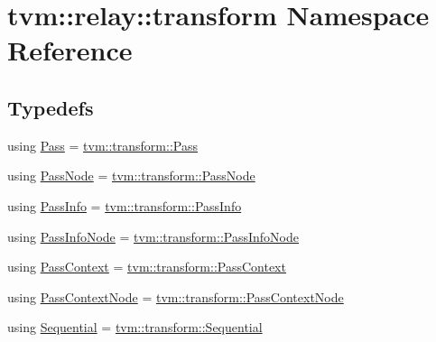 \hypertarget{namespacetvm_1_1relay_1_1transform}{}\section{tvm\+:\+:relay\+:\+:transform Namespace Reference}
\label{namespacetvm_1_1relay_1_1transform}
\subsection*{Typedefs}
\begin{DoxyCompactItemize}
\item 
using \hyperlink{namespacetvm_1_1relay_1_1transform_afa666ade112e9955059095d695238a9a}{Pass} = \hyperlink{classtvm_1_1transform_1_1Pass}{tvm\+::transform\+::\+Pass}
\item 
using \hyperlink{namespacetvm_1_1relay_1_1transform_aa695a8dfc3d5b087018ddd4ef1eb2487}{Pass\+Node} = \hyperlink{classtvm_1_1transform_1_1PassNode}{tvm\+::transform\+::\+Pass\+Node}
\item 
using \hyperlink{namespacetvm_1_1relay_1_1transform_aa405b5f11938fb8c4fa2ca21926edc9d}{Pass\+Info} = \hyperlink{classtvm_1_1transform_1_1PassInfo}{tvm\+::transform\+::\+Pass\+Info}
\item 
using \hyperlink{namespacetvm_1_1relay_1_1transform_aae88cd0ad69cf64c7e9caf0a0c8ebb45}{Pass\+Info\+Node} = \hyperlink{classtvm_1_1transform_1_1PassInfoNode}{tvm\+::transform\+::\+Pass\+Info\+Node}
\item 
using \hyperlink{namespacetvm_1_1relay_1_1transform_a744a05f8bba3c2ac238ba4569d926184}{Pass\+Context} = \hyperlink{classtvm_1_1transform_1_1PassContext}{tvm\+::transform\+::\+Pass\+Context}
\item 
using \hyperlink{namespacetvm_1_1relay_1_1transform_a72900733e0d3510ae61a1c287c2ec125}{Pass\+Context\+Node} = \hyperlink{classtvm_1_1transform_1_1PassContextNode}{tvm\+::transform\+::\+Pass\+Context\+Node}
\item 
using \hyperlink{namespacetvm_1_1relay_1_1transform_a3ae923037d22b4640b450c06e6c1e33e}{Sequential} = \hyperlink{classtvm_1_1transform_1_1Sequential}{tvm\+::transform\+::\+Sequential}
\end{DoxyCompactItemize}
